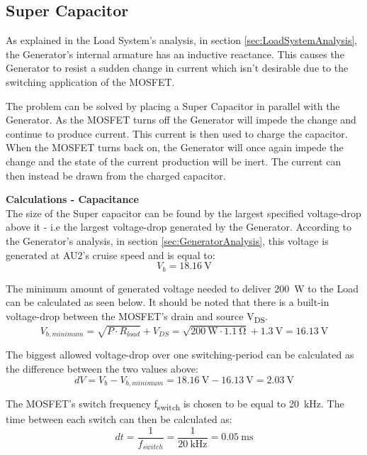 \subsection{Super Capacitor}
As explained in the Load System's analysis, in section \vref{sec:LoadSystemAnalysis}, the Generator's internal armature has an inductive reactance. This causes the Generator to resist a sudden change in current which isn't desirable due to the switching application of the MOSFET.

The problem can be solved by placing a Super Capacitor in parallel with the Generator. As the MOSFET turns off the Generator will impede the change and continue to produce current. This current is then used to charge the capacitor. When the MOSFET turns back on, the Generator will once again impede the change and the state of the current production will be inert. The current can then instead be drawn from the charged capacitor.

\textbf{Calculations - Capacitance}\\
The size of the Super capacitor can be found by the largest specified voltage-drop above it - i.e the largest voltage-drop generated by the Generator. According to the Generator's analysis, in section \vref{sec:GeneratorAnalysis}, this voltage is generated at AU2's cruise speed and is equal to:
\begin{equation}
	V_b = \SI{18.16}{\volt}
\end{equation}

The minimum amount of generated voltage needed to deliver \SI{200}{\watt} to the Load can be calculated as seen below. It should be noted that there is a built-in voltage-drop between the MOSFET's drain and source V\textsubscript{DS}\cite{IRFP260N}.
\begin{equation}
	V_{b,minimum} = \sqrt{P \cdot R_{load}} + V_{DS}= \sqrt{\SI{200}{\watt} \cdot \SI{1.1}{\ohm}} + \SI{1.3}{\volt}= \SI{16.13}{\volt}
\end{equation}

\newpage
The biggest allowed voltage-drop over one switching-period can be calculated as the difference between the two values above:
\begin{equation}
	dV = V_b - V_{b,minimum} = \SI{18.16}{\volt} - \SI{16.13}{\volt} = \SI{2.03}{\volt}
\end{equation}
 
The MOSFET's switch frequency f\textsubscript{switch} is chosen to be equal to \SI{20}{\kilo \hertz}. The time between each switch can then be calculated as:
\begin{equation}
	dt = \frac{1}{f_{switch}} = \frac{1}{\SI{20}{\kilo \hertz}} = \SI{0.05}{\milli \second}
\end{equation}

